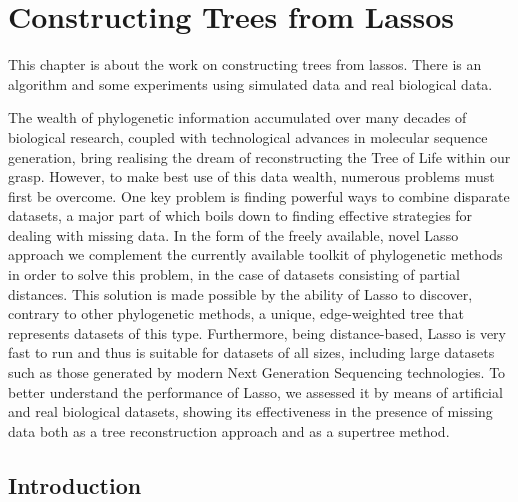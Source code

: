 \chapter{Constructing Trees from Lassos}
\label{cha:lasso-construction}

This chapter is about the work on constructing trees from lassos.  There is an
algorithm and some experiments using simulated data and real biological data.

The wealth of phylogenetic information accumulated over many decades of
biological research, coupled with technological advances in molecular sequence
generation, bring realising the dream of reconstructing the Tree of Life
within our grasp. However, to make best use of this data wealth, numerous
problems must first be overcome. One key problem is finding powerful ways to
combine disparate datasets, a major part of which boils down to finding
effective strategies for dealing with missing data. In the form of the freely
available, novel {\sc Lasso} approach we complement the currently available
toolkit of phylogenetic methods in order to solve this problem, in the case of
datasets consisting of partial distances.  This solution is made possible by
the ability of {\sc Lasso} to discover, contrary to other phylogenetic
methods, a unique, edge-weighted tree that represents datasets of this type.
Furthermore, being distance-based, {\sc Lasso} is very fast to run and thus is
suitable for datasets of all sizes, including large datasets such as those
generated by modern Next Generation Sequencing technologies. To better
understand the performance of {\sc Lasso}, we assessed it by means of
artificial and real biological datasets, showing its effectiveness in the
presence of missing data both as a tree reconstruction approach and as a
supertree method.

\newpage

\section{Introduction}
\label{sec:introduction}

